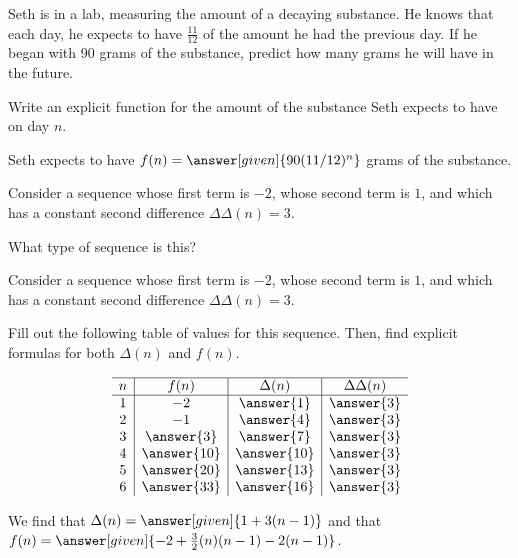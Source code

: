 \documentclass[nooutcomes]{ximera}
\begin{document}
\begin{problem}
Seth is in a lab, measuring the amount of a decaying substance.  He knows that each day, he expects to have $\frac{11}{12}$ of the amount he had the previous day.  If he began with $90$ grams of the substance, predict how many grams he will have in the future.

Write an explicit function for the amount of the substance Seth expects to have on day $n$.
\begin{prompt}
Seth expects to have $f(n) = \answer[given]{90(11/12)^n}$ grams of the substance.
\end{prompt}

\end{problem}



\begin{problem}
Consider a sequence whose first term is $-2$, whose second term is $1$, and which has a constant second difference $\Delta \Delta (n) =3$.

What type of sequence is this?
\begin{multipleChoice}
\end{multipleChoice}


\end{problem}



\begin{problem}
Consider a sequence whose first term is $-2$, whose second term is $1$, and which has a constant second difference $\Delta \Delta (n) =3$.

Fill out the following table of values for this sequence.  Then, find explicit formulas for both $\Delta(n)$ and $f(n)$.

\[
\begin{array}{c|c|c|c} \hline
n & f(n) & \Delta(n) & \Delta \Delta(n) \\ \hline
1 & -2 & \answer{1} & \answer{3} \\
2 & -1 & \answer{4} & \answer{3} \\
3 & \answer{3} & \answer{7} & \answer{3} \\
4 & \answer{10} & \answer{10} & \answer{3} \\
5 & \answer{20} & \answer{13} & \answer{3} \\
6 & \answer{33} & \answer{16} & \answer{3} \\
\end{array}
\]

\begin{prompt}
We find that $\Delta(n) = \answer[given]{1+3(n-1)}$ and that $f(n) = \answer[given]{-2 + \frac{3}{2} (n)(n-1) - 2(n-1)}$.
\end{prompt}

\end{problem}
\end{document}
